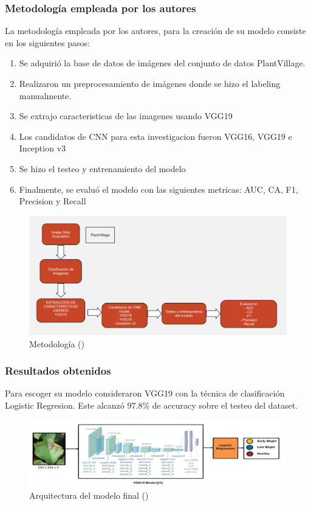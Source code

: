 \subsubsection{Metodología empleada por los autores}
La metodología empleada por los autores, para la creación de su modelo consiste en los siguientes pasos: 
 \begin{enumerate}
	\item Se adquirió la base de datos de imágenes del conjunto de datos PlantVillage.
	\item Realizaron un preprocesamiento de imágenes donde se hizo el labeling manualmente.
	\item Se extrajo caracteristicas de las imagenes usando VGG19
	\item Los candidatos de CNN para esta investigacion fueron VGG16, VGG19 e Inception v3
	\item Se hizo el testeo y entrenamiento del modelo
	\item Finalmente, se evaluó el modelo con las siguientes metricas: AUC, CA, F1, Precision y Recall
\end{enumerate}
\begin{figure}[H]
	\begin{center}
		\includegraphics[width=1\textwidth]{2/figures/ant7.jpg}
		\caption{Metodología (\cite{antecedente7})}
	\end{center}
\end{figure}

\subsubsection{Resultados obtenidos}
Para escoger su modelo consideraron VGG19 con la técnica de clasificación Logistic Regresion. Este alcanzó 97.8\% de accuracy sobre el testeo del dataset. 

\begin{figure}[H]
	\begin{center}
		\includegraphics[width=1\textwidth]{2/figures/ant7.2.jpeg}
		\caption{Arquitectura del modelo final (\cite{antecedente7})}
	\end{center}
\end{figure}
